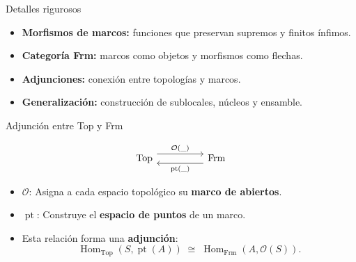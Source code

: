 \documentclass[compress,12pt]{beamer}
\DeclareMathOperator{\pt}{pt}
\DeclareMathOperator{\Frm}{Frm}
\DeclareMathOperator{\Top}{Top}
\DeclareMathOperator{\Hom}{Hom}
\begin{document}
\begin{frame}{Detalles rigurosos}
  \begin{itemize}
    \item<1-> \textbf{Morfismos de marcos:} funciones que preservan supremos y finitos ínfimos.
    \item<2-> \textbf{Categoría Frm:} marcos como objetos y morfismos como flechas.
    \item<3-> \textbf{Adjunciones:} conexión entre topologías y marcos.
    \item<4-> \textbf{Generalización:} construcción de sublocales, núcleos y ensamble.
  \end{itemize}

    \vspace{1em}
\end{frame}

\begin{frame}[fragile]{Adjunción entre Top y Frm}
 
\[\begin{tikzcd}
	\Top && \Frm
	\arrow["{\mathcal{O}(\_)}", shift left=2, from=1-1, to=1-3]
	\arrow["{\pt(\_)}", shift left=2, from=1-3, to=1-1]
\end{tikzcd}\]
  \vspace{1em}

  \begin{itemize}
    \item<2-> $\mathcal{O}$: Asigna a cada espacio topológico su \textbf{marco de abiertos}.
    \item<3-> $\pt$: Construye el \textbf{espacio de puntos} de un marco.
    \item<4-> Esta relación forma una \textbf{adjunción}:
    \[
      \Hom_{\Top}(S, \pt(A)) \;\cong\; \Hom_{\Frm}(A, \mathcal{O}(S)).
    \]
  \end{itemize}

  \vspace{0.5em}
\end{frame}
\end{document}
